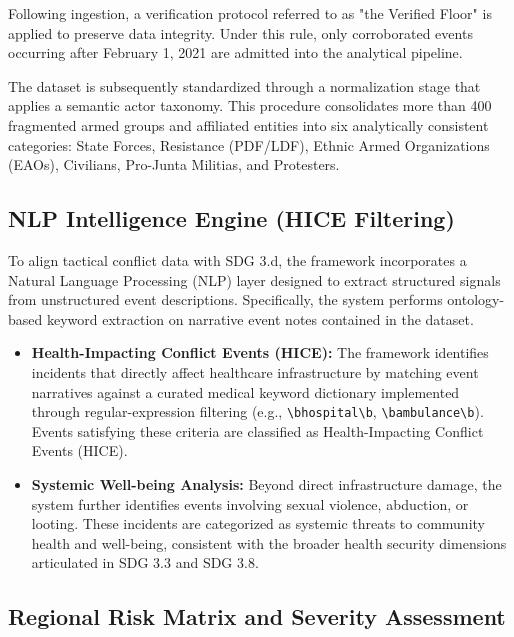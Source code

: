 \documentclass[conference]{IEEEtran}
\begin{document}
Following ingestion, a verification protocol referred to as "the Verified Floor" is applied to preserve data integrity. Under this rule, only corroborated events occurring after February 1, 2021 are admitted into the analytical pipeline.

The dataset is subsequently standardized through a normalization stage that applies a semantic actor taxonomy. This procedure consolidates more than 400 fragmented armed groups and affiliated entities into six analytically consistent categories: State Forces, Resistance (PDF/LDF), Ethnic Armed Organizations (EAOs), Civilians, Pro-Junta Militias, and Protesters.

\subsection{NLP Intelligence Engine (HICE Filtering)}

To align tactical conflict data with SDG 3.d, the framework incorporates a Natural Language Processing (NLP) layer designed to extract structured signals from unstructured event descriptions. Specifically, the system performs ontology-based keyword extraction on narrative event notes contained in the dataset.

\begin{itemize}
    \item \textbf{Health-Impacting Conflict Events (HICE):} The framework identifies incidents that directly affect healthcare infrastructure by matching event narratives against a curated medical keyword dictionary implemented through regular-expression filtering (e.g., \texttt{\textbackslash bhospital\textbackslash b}, \texttt{\textbackslash bambulance\textbackslash b}). Events satisfying these criteria are classified as Health-Impacting Conflict Events (HICE).

    \item \textbf{Systemic Well-being Analysis:} Beyond direct infrastructure damage, the system further identifies events involving sexual violence, abduction, or looting. These incidents are categorized as systemic threats to community health and well-being, consistent with the broader health security dimensions articulated in SDG 3.3 and SDG 3.8.
\end{itemize}

\subsection{Regional Risk Matrix and Severity Assessment}
\end{document}
